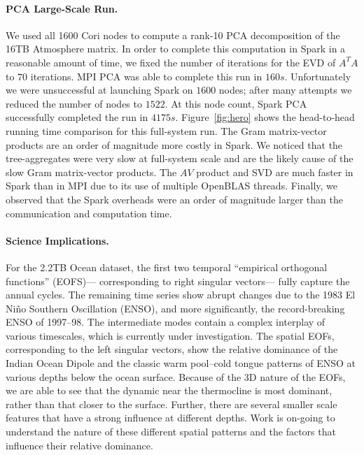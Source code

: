 \paragraph{PCA Large-Scale Run.}
We used all 1600 Cori nodes to compute a rank-10 PCA decomposition of the 16TB Atmosphere matrix. In order to complete this computation in Spark in a reasonable amount of time, we fixed the number of iterations for the EVD of $A^TA$ to $70$ iterations. MPI PCA was able to complete this run in $160s$. Unfortunately we were unsuccessful at launching Spark on $1600$ nodes; after many attempts we reduced the number of nodes to $1522$. At this node count, Spark PCA successfully completed the run in $4175s$. Figure~\ref{fig:hero} shows the head-to-head running time comparison for this full-system run. The Gram matrix-vector products are an order of magnitude more costly in Spark. We noticed that the tree-aggregates were very slow at full-system scale and are the likely cause of the slow Gram matrix-vector products. The $AV$ product and SVD are much faster in Spark than in MPI due to its use of multiple OpenBLAS threads. Finally, we observed that the Spark overheads were an order of magnitude larger than the communication and computation time.

\paragraph{Science Implications.}
For the 2.2TB Ocean dataset, the first two temporal ``empirical orthogonal functions'' (EOFS)--- corresponding to right singular vectors--- fully capture the annual cycles. The remaining time series show abrupt changes due to the 1983 El Ni\~no Southern Oscillation (ENSO), and more significantly, the record-breaking ENSO of 1997--98. The intermediate modes contain a complex interplay of various timescales, which is currently under investigation. The spatial EOFs, corresponding to the left singular vectors, show the relative dominance of the Indian Ocean Dipole and the classic warm pool--cold tongue patterns of ENSO at various depths below the ocean surface. Because of the 3D nature of the EOFs, we are able to see that the dynamic near the thermocline is most dominant, rather than that closer to the surface. Further, there are several smaller scale features that have a strong influence at different depths. Work is on-going to understand the nature of these different spatial patterns and the factors that influence their relative dominance.
 
